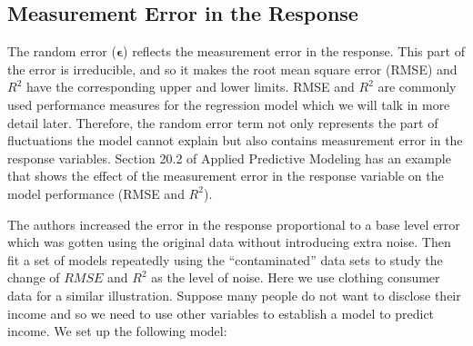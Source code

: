\documentclass[12pt,]{krantz}
\newenvironment{Shaded}{\begin{snugshade}}{\end{snugshade}}
\newcommand{\KeywordTok}[1]{\textcolor[rgb]{0.13,0.29,0.53}{\textbf{{#1}}}}
\newcommand{\DataTypeTok}[1]{\textcolor[rgb]{0.13,0.29,0.53}{{#1}}}
\newcommand{\FloatTok}[1]{\textcolor[rgb]{0.00,0.00,0.81}{{#1}}}
\newcommand{\StringTok}[1]{\textcolor[rgb]{0.31,0.60,0.02}{{#1}}}
\newcommand{\CommentTok}[1]{\textcolor[rgb]{0.56,0.35,0.01}{\textit{{#1}}}}
\newcommand{\NormalTok}[1]{{#1}}
\theoremstyle{definition}
\theoremstyle{definition}
\theoremstyle{remark}
\begin{document}
\subsection{Measurement Error in the
Response}\label{measurement-error-in-the-response}

The random error (\(\mathbf{\epsilon}\)) reflects the measurement error
in the response. This part of the error is irreducible, and so it makes
the root mean square error (RMSE) and \(R^2\) have the corresponding
upper and lower limits. RMSE and \(R^2\) are commonly used performance
measures for the regression model which we will talk in more detail
later. Therefore, the random error term not only represents the part of
fluctuations the model cannot explain but also contains measurement
error in the response variables. Section 20.2 of Applied Predictive
Modeling \citep{APM} has an example that shows the effect of the
measurement error in the response variable on the model performance
(RMSE and \(R^2\)).

The authors increased the error in the response proportional to a base
level error which was gotten using the original data without introducing
extra noise. Then fit a set of models repeatedly using the
``contaminated'' data sets to study the change of \(RMSE\) and \(R^2\)
as the level of noise. Here we use clothing consumer data for a similar
illustration. Suppose many people do not want to disclose their income
and so we need to use other variables to establish a model to predict
income. We set up the following model:

\begin{Shaded}
\end{Shaded}
\end{document}
